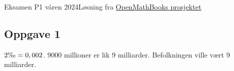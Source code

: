 





{\Large Eksamen P1 våren 2024\hfill {\footnotesize Løsning fra \color{blue} \href{https://sindreheggen.wordpress.com/}{OpenMathBooks prosjektet}}}	
\subsection*{Oppgave 1}
$ 2\text{\textperthousand}=0,002 $.
9000 millioner er lik 9 milliarder. Befolkningen ville vært 9 milliarder.

